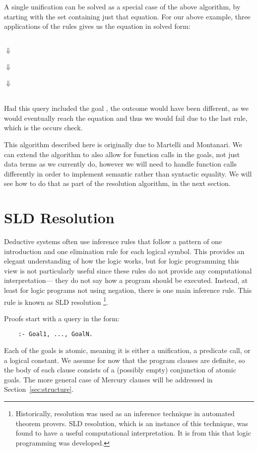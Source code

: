 A single unification can be solved
as a special case of the above algorithm,
by starting with the set containing just that equation.
For our above example,
three applications of the rules gives us
the equation in solved form:
\begin{center}
 \\
$\Downarrow$ \\
 \\
$\Downarrow$ \\
 \\
$\Downarrow$ \\
 \\[1.5em]
\end{center}
Had this query included the goal ,
the outcome would have been different,
as we would eventually reach the equation 
and thus we would fail due to the last rule,
which is the occurs check.

This algorithm described here
is originally due to Martelli and Montanari.
We can extend the algorithm
to also allow for function calls in the goals,
not just data terms as we currently do,
however we will need to handle function calls differently
in order to implement
semantic rather than syntactic equality.
We will see how to do that as part of the resolution algorithm,
in the next section.


\section{SLD Resolution}
\label{sec:resolution}

Deductive systems often use
inference rules that follow a pattern of
one introduction and one elimination rule
for each logical symbol.
This provides an elegant understanding of how the logic works,
but for logic programming this view is not particularly useful
since these rules do not provide any computational interpretation---%
they do not say how a program should be executed.
Instead, at least for logic programs not using negation,
there is one main inference rule.
This rule is known as SLD resolution\label{gi:resolution}%
\footnote{
Historically,
resolution was used as an inference technique
in automated theorem provers.
SLD resolution, which is an instance of this technique,
was found to have a useful computational interpretation.
It is from this that logic programming was developed.
}.

Proofs start with a query in the form:
\begin{verbatim}
    :- Goal1, ..., GoalN.
\end{verbatim}
Each of the goals is atomic\label{gi:atomic},
meaning it is either a unification, a predicate call, or a logical constant.
We assume for now that the program clauses are definite,
so the body of each clause
consists of a (possibly empty) conjunction of atomic goals.
The more general case of Mercury clauses
will be addressed in Section~\ref{sec:structure}.

